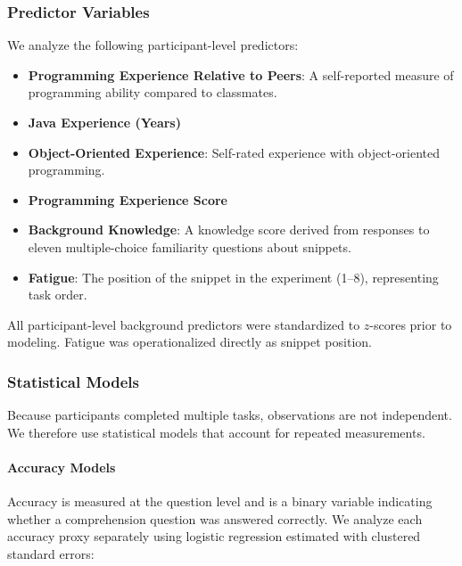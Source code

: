 \subsubsection{Predictor Variables}

We analyze the following participant-level predictors:

\begin{itemize}

\item \textbf{Programming Experience Relative to Peers}: A self-reported measure of programming ability compared to classmates.

\item \textbf{Java Experience (Years)}

\item \textbf{Object-Oriented Experience}: Self-rated experience with object-oriented programming.

\item \textbf{Programming Experience Score}

\item \textbf{Background Knowledge}: A knowledge score derived from responses to eleven multiple-choice familiarity questions about snippets.

\item \textbf{Fatigue}: The position of the snippet in the experiment (1--8), representing task order.

\end{itemize}

All participant-level background predictors were standardized to $z$-scores prior to modeling. Fatigue was operationalized directly as snippet position.

\subsubsection{Statistical Models}

Because participants completed multiple tasks, observations are not independent. We therefore use statistical models that account for repeated measurements.

\paragraph{Accuracy Models}

Accuracy is measured at the question level and is a binary variable indicating whether a comprehension question was answered correctly. We analyze each accuracy proxy separately using logistic regression estimated with clustered standard errors:

